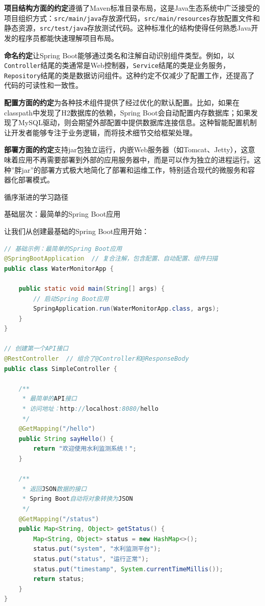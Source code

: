 \textbf{项目结构方面的约定}遵循了Maven标准目录布局，这是Java生态系统中广泛接受的项目组织方式：\texttt{src/main/java}存放源代码，\texttt{src/main/resources}存放配置文件和静态资源，\texttt{src/test/java}存放测试代码。这种标准化的结构使得任何熟悉Java开发的程序员都能快速理解项目布局。

\textbf{命名约定}让Spring Boot能够通过类名和注解自动识别组件类型。例如，以\texttt{Controller}结尾的类通常是Web控制器，\texttt{Service}结尾的类是业务服务，\texttt{Repository}结尾的类是数据访问组件。这种约定不仅减少了配置工作，还提高了代码的可读性和一致性。

\textbf{配置方面的约定}为各种技术组件提供了经过优化的默认配置。比如，如果在classpath中发现了H2数据库的依赖，Spring Boot会自动配置内存数据库；如果发现了MySQL驱动，则会期望外部配置中提供数据库连接信息。这种智能配置机制让开发者能够专注于业务逻辑，而将技术细节交给框架处理。

\textbf{部署方面的约定}支持jar包独立运行，内嵌Web服务器（如Tomcat、Jetty），这意味着应用不再需要部署到外部的应用服务器中，而是可以作为独立的进程运行。这种''胖jar''的部署方式极大地简化了部署和运维工作，特别适合现代的微服务和容器化部署模式。

 循序渐进的学习路径

 基础层次：最简单的Spring Boot应用

让我们从创建最基础的Spring Boot应用开始：

\begin{lstlisting}[language=Java]
// 基础示例：最简单的Spring Boot应用
@SpringBootApplication  // 复合注解，包含配置、自动配置、组件扫描
public class WaterMonitorApp {
    
    public static void main(String[] args) {
        // 启动Spring Boot应用
        SpringApplication.run(WaterMonitorApp.class, args);
    }
}

// 创建第一个API接口
@RestController  // 组合了@Controller和@ResponseBody
public class SimpleController {
    
    /**
     * 最简单的API接口
     * 访问地址：http://localhost:8080/hello
     */
    @GetMapping("/hello")
    public String sayHello() {
        return "欢迎使用水利监测系统！";
    }
    
    /**
     * 返回JSON数据的接口
     * Spring Boot自动将对象转换为JSON
     */
    @GetMapping("/status")
    public Map<String, Object> getStatus() {
        Map<String, Object> status = new HashMap<>();
        status.put("system", "水利监测平台");
        status.put("status", "运行正常");
        status.put("timestamp", System.currentTimeMillis());
        return status;
    }
}
\end{lstlisting}

